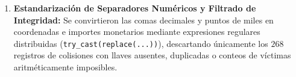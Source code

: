 \begin{enumerate}
    \item \textbf{Estandarización de Separadores Numéricos y Filtrado de Integridad:} Se convirtieron las comas decimales y puntos de miles en coordenadas e importes monetarios mediante expresiones regulares distribuidas (\texttt{try\_cast(replace(...))}), descartando únicamente los $268$ registros de colisiones con llaves ausentes, duplicadas o conteos de víctimas aritméticamente imposibles.
\end{enumerate}
